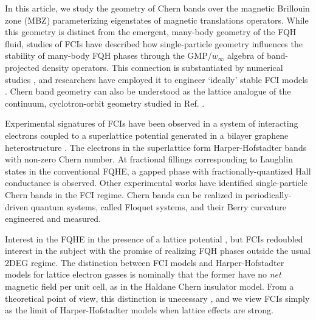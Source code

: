 \documentclass[aps,prb,twocolumn,letterpaper,twoside,nobalancelastpage,groupedaddress,amsmath,amssymb,floatfix,citeautoscript]{revtex4-1}
\begin{document}
 In this article, we study the geometry of Chern bands over the magnetic Brillouin zone (MBZ) parameterizing eigenstates of magnetic translations operators\cite{zak_magnetic_1964}. While this geometry is distinct from the emergent, many-body geometry of the FQH fluid, studies of FCIs have described how single-particle geometry influences the stability of many-body FQH phases through the GMP/$w_{\infty}$ algebra of band-projected density operators.\cite{Girvin:1986bu,parameswaran_fractional_2012,parameswaran_fractional_2013, roy_band_2014} This connection is substantiated by numerical studies \cite{jackson_geometric_2015,Claassen2015,bauer_quantum_2016}, and researchers have employed it to engineer `ideally' stable FCI models \cite{Lee2017}. Chern band geometry can also be understood as the lattice analogue of the continuum, cyclotron-orbit geometry studied in Ref. .

 Experimental signatures of FCIs have been observed in a system of interacting electrons coupled to a superlattice potential generated in a bilayer graphene heterostructure \cite{Spantoneaan8458}. The electrons in the superlattice form Harper-Hofstadter bands with non-zero Chern number. At fractional fillings corresponding to Laughlin states in the conventional FQHE, a gapped phase with fractionally-quantized Hall conductance is observed. \cite{Spantoneaan8458} Other experimental works have identified single-particle Chern bands in the FCI regime. \cite{Jotzu2014,Aidelsburger:2014hm,Aidelsburger:2013ew} Chern bands can be realized in periodically-driven quantum systems, called Floquet systems, and their Berry curvature engineered and measured.\cite{Flaschner1091}

Interest in the FQHE in the presence of a lattice potential \cite{kol_fractional_1993,sørensen_fractional_2005,palmer_high-field_2006}, but FCIs redoubled interest in the subject with the promise of realizing FQH phases outside the usual 2DEG regime. The distinction between FCI models and Harper-Hofstadter \cite{harper_general_1955,Azbel:1964tk,hofstadter_energy_1976} models for lattice electron gasses is nominally that the former have no \textit{net} magnetic field per unit cell, as in the Haldane Chern insulator model\cite{haldane_model_1988}. From a theoretical point of view, this distinction is unecessary \cite{mcgreevy_wave_2012}, and we view FCIs simply as the limit of Harper-Hofstadter models when lattice effects are strong. 
\end{document}
